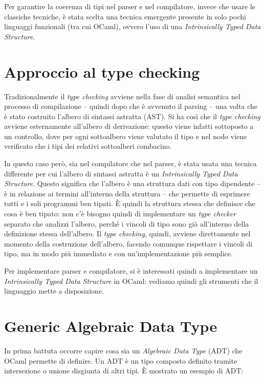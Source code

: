 \documentclass[12pt,a4paper]{report}
\begin{document}
Per garantire la coerenza di tipi nel parser e nel compilatore, invece
che usare le classiche tecniche, è stata scelta una tecnica emergente
presente in solo pochi linguaggi funzionali (tra cui OCaml), ovvero
l'uso di una \emph{Intrinsically Typed Data Structure}.

\hypertarget{approccio-al-type-checking}{%
\section{Approccio al type checking}\label{approccio-al-type-checking}}

Tradizionalmente il \emph{type checking} avviene nella fase di analisi
semantica nel processo di compilazione -- quindi dopo che è avvenuto il
parsing -- una volta che è stato costruito l'albero di sintassi astratta
(AST). Si ha così che il \emph{type checking} avviene esternamente
all'albero di derivazione: questo viene infatti sottoposto a un
controllo, dove per ogni sottoalbero viene valutato il tipo e nel nodo
viene verificato che i tipi dei relativi sottoalberi combacino.

In questo caso però, sia nel compilatore che nel parser, è stata usata
una tecnica differente per cui l'albero di sintassi astratta è un
\emph{Intrinsically Typed Data Structure}. Questo significa che l'albero
è una struttura dati con tipo dipendente -- è in relazione ai termini
all'interno della struttura -- che permette di esprimere tutti e i soli
programmi ben tipati. È quindi la struttura stessa che definisce che
cosa è ben tipato: non c'è bisogno quindi di implementare un \emph{type
checker} separato che analizzi l'albero, perché i vincoli di tipo sono
già all'interno della definizione stessa dell'albero. Il \emph{type
checking}, quindi, avviene direttamente nel momento della costruzione
dell'albero, facendo comunque rispettare i vincoli di tipo, ma in modo
più immediato e con un'implementazione più semplice.

Per implementare parser e compilatore, si è interessati quindi a
implementare un \emph{Intrinsically Typed Data Structure} in OCaml:
vediamo quindi gli strumenti che il linguaggio mette a disposizione.

\hypertarget{generic-algebraic-data-type}{%
\section{Generic Algebraic Data
Type}\label{generic-algebraic-data-type}}

In prima battuta occorre capire cosa sia un \emph{Algebraic Data Type}
(ADT) che OCaml permette di definire. Un ADT è un tipo composto definito
tramite intersezione o unione disgiunta di altri tipi. È mostrato un
esempio di ADT:
\end{document}

